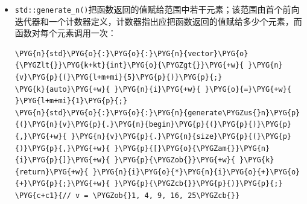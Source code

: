 \begin{itemize}

\begin{codeblockbg}
\begin{Verbatim}[commandchars=\\\{\},breaklines=true,breakanywhere=true,fontsize=\codefont,xleftmargin=17bp]
\PYG{n}{std}\PYG{o}{:}\PYG{o}{:}\PYG{n}{random\PYGZus{}device}\PYG{+w}{ }\PYG{n}{rd}\PYG{p}{\PYGZob{}}\PYG{p}{\PYGZcb{}}\PYG{p}{;}
\PYG{n}{std}\PYG{o}{:}\PYG{o}{:}\PYG{n}{mt19937}\PYG{+w}{ }\PYG{n}{mt}\PYG{p}{\PYGZob{}}\PYG{+w}{ }\PYG{n}{rd}\PYG{p}{(}\PYG{p}{)}\PYG{+w}{ }\PYG{p}{\PYGZcb{}}\PYG{p}{;}
\PYG{n}{std}\PYG{o}{:}\PYG{o}{:}\PYG{n}{uniform\PYGZus{}int\PYGZus{}distribution}\PYG{o}{\PYGZlt{}}\PYG{o}{\PYGZgt{}}\PYG{+w}{ }\PYG{n}{ud}\PYG{p}{\PYGZob{}}\PYG{l+m+mi}{1}\PYG{p}{,}\PYG{+w}{ }\PYG{l+m+mi}{10}\PYG{p}{\PYGZcb{}}\PYG{p}{;}
\PYG{n}{std}\PYG{o}{:}\PYG{o}{:}\PYG{n}{vector}\PYG{o}{\PYGZlt{}}\PYG{k+kt}{int}\PYG{o}{\PYGZgt{}}\PYG{+w}{ }\PYG{n}{v}\PYG{p}{(}\PYG{l+m+mi}{5}\PYG{p}{)}\PYG{p}{;}
\PYG{n}{std}\PYG{o}{:}\PYG{o}{:}\PYG{n}{generate}\PYG{p}{(}\PYG{n}{v}\PYG{p}{.}\PYG{n}{begin}\PYG{p}{(}\PYG{p}{)}\PYG{p}{,}\PYG{+w}{ }\PYG{n}{v}\PYG{p}{.}\PYG{n}{end}\PYG{p}{(}\PYG{p}{)}\PYG{p}{,}
\PYG{+w}{              }\PYG{p}{[}\PYG{o}{\PYGZam{}}\PYG{n}{ud}\PYG{p}{,}\PYG{+w}{ }\PYG{o}{\PYGZam{}}\PYG{n}{mt}\PYG{p}{]}\PYG{+w}{ }\PYG{p}{\PYGZob{}}\PYG{k}{return}\PYG{+w}{ }\PYG{n}{ud}\PYG{p}{(}\PYG{n}{mt}\PYG{p}{)}\PYG{p}{;}\PYG{+w}{ }\PYG{p}{\PYGZcb{}}\PYG{p}{)}\PYG{p}{;}
\end{Verbatim}
\end{codeblockbg}



\item \texttt{std::\allowbreak{}generate\_\allowbreak{}n()}把函数返回的值赋给范围中若干元素；该范围由首个前向迭代器和一个计数器定义，计数器指出应把函数返回的值赋给多少个元素，而函数对每个元素调用一次：



\begin{codeblockbg}
\begin{Verbatim}[commandchars=\\\{\},breaklines=true,breakanywhere=true,fontsize=\codefont,xleftmargin=17bp]
\PYG{n}{std}\PYG{o}{:}\PYG{o}{:}\PYG{n}{vector}\PYG{o}{\PYGZlt{}}\PYG{k+kt}{int}\PYG{o}{\PYGZgt{}}\PYG{+w}{ }\PYG{n}{v}\PYG{p}{(}\PYG{l+m+mi}{5}\PYG{p}{)}\PYG{p}{;}
\PYG{k}{auto}\PYG{+w}{ }\PYG{n}{i}\PYG{+w}{ }\PYG{o}{=}\PYG{+w}{ }\PYG{l+m+mi}{1}\PYG{p}{;}
\PYG{n}{std}\PYG{o}{:}\PYG{o}{:}\PYG{n}{generate\PYGZus{}n}\PYG{p}{(}\PYG{n}{v}\PYG{p}{.}\PYG{n}{begin}\PYG{p}{(}\PYG{p}{)}\PYG{p}{,}\PYG{+w}{ }\PYG{n}{v}\PYG{p}{.}\PYG{n}{size}\PYG{p}{(}\PYG{p}{)}\PYG{p}{,}\PYG{+w}{ }\PYG{p}{[}\PYG{o}{\PYGZam{}}\PYG{n}{i}\PYG{p}{]}\PYG{+w}{ }\PYG{p}{\PYGZob{}}\PYG{+w}{ }\PYG{k}{return}\PYG{+w}{ }\PYG{n}{i}\PYG{o}{*}\PYG{n}{i}\PYG{o}{+}\PYG{o}{+}\PYG{p}{;}\PYG{+w}{ }\PYG{p}{\PYGZcb{}}\PYG{p}{)}\PYG{p}{;}
\PYG{c+c1}{// v = \PYGZob{}1, 4, 9, 16, 25\PYGZcb{}}
\end{Verbatim}
\end{codeblockbg}



\end{itemize}
